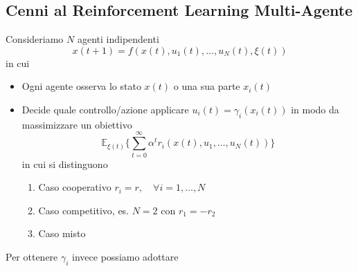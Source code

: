 \subsection{Cenni al Reinforcement Learning Multi-Agente}
Consideriamo $N$ agenti indipendenti
\begin{equation}
x(t+1) = f(x(t), u_1(t), \dots, u_N(t), \xi(t))
\end{equation} in cui 
\begin{itemize}
\item Ogni agente osserva lo stato $x(t)$ o una sua parte $x_i(t)$
\item Decide quale controllo/azione applicare $u_i(t) = \gamma_i(x_i(t))$ in modo da massimizzare un obiettivo
    \begin{equation}
    \mathbb{E}_{\xi(t)} \Big \{ \sum_{t=0}^\infty \alpha^t r_i(x(t), u_1, \dots, u_N(t)) \Big \}
    \end{equation} in cui si distinguono
\begin{enumerate}
    \item Caso cooperativo $r_i = r, \quad \forall i=1, \dots, N$
    \item Caso competitivo, es. $N=2$ con $r_1 = -r_2$
    \item Caso misto
\end{enumerate}
\end{itemize}
Per ottenere $\gamma_i$ invece possiamo adottare

